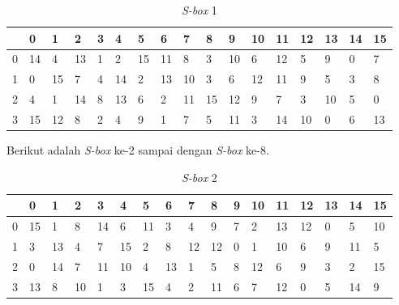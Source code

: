 \begin{enumerate}
\begin{table}[H]
	\begin{center}
		\begin{tabular}{|l|l|l|l|l|l|l|l|l|l|l|l|l|l|l|l|l|}
				\hline
				& 0 & 1	& 2 & 3 & 4 & 5 & 6 & 7 & 8 & 9 & 10 & 11 & 12 & 13 & 14 & 15	\\ \hline
			0 & 14 & 4 & 13 & 1 & 2 & 15 & 11 & 8 & 3 & 10 & 6 & 12 & 5 & 9 & 0 & 7	\\ \hline
			1 & 0 & 15 & 7 & 4 & 14 & 2 & 13 & 10 & 3 & 6 & 12 & 11 & 9 & 5 & 3 & 8	\\ \hline
			2 & 4 & 1 & 14 & 8 & 13 & 6 & 2 & 11 & 15 & 12 & 9 & 7 & 3 & 10 & 5 & 0	\\ \hline
			3 & 15 & 12 & 8 & 2 & 4 & 9 & 1 & 7 & 5 & 11 & 3 & 14 & 10 & 0 & 6 & 13	\\ \hline
		\end{tabular}
	\end{center}
	\caption{\textit{S-box} 1}\label{table:s_box1}
\end{table}

Berikut adalah \textit{S-box} ke-2 sampai dengan \textit{S-box} ke-8.

\begin{table}[H]
	\begin{center}
		\begin{tabular}{|l|l|l|l|l|l|l|l|l|l|l|l|l|l|l|l|l|}
				\hline
				& 0 & 1	& 2 & 3 & 4 & 5 & 6 & 7 & 8 & 9 & 10 & 11 & 12 & 13 & 14 & 15	\\ \hline
			0 & 15 & 1 & 8 & 14 & 6 & 11 & 3 & 4 & 9 & 7 & 2 & 13 & 12 & 0 & 5 & 10	\\ \hline
			1 & 3 & 13 & 4 & 7 & 15 & 2 & 8 & 12 & 12 & 0 & 1 & 10 & 6 & 9 & 11 & 5	\\ \hline
			2 & 0 & 14 & 7 & 11 & 10 & 4 & 13 & 1 & 5 & 8 & 12 & 6 & 9 & 3 & 2 & 15	\\ \hline
			3 & 13 & 8 & 10 & 1 & 3 & 15 & 4 & 2 & 11 & 6 & 7 & 12 & 0 & 5 & 14 & 9	\\ \hline
		\end{tabular}
	\end{center}
	\caption{\textit{S-box} 2}\label{table:s_box2}
\end{table}


\end{enumerate}
